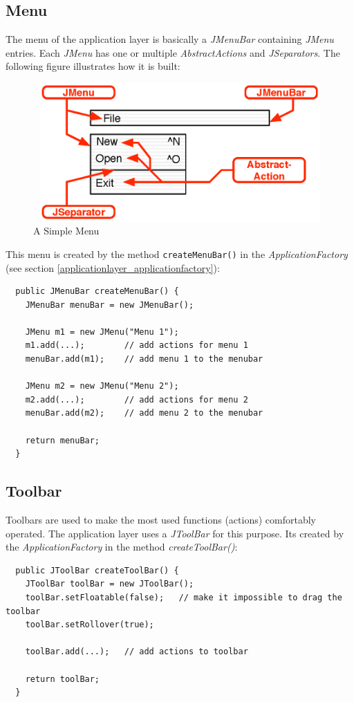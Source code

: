 \subsection{Menu}
The menu of the application layer is basically a \textit{JMenuBar} containing \textit{JMenu} entries. Each \textit{JMenu} has one or multiple \textit{AbstractActions} and \textit{JSeparators}. The following figure illustrates how it is built:
\begin{figure}[H]
\begin{center}
  \includegraphics[height= 2.08in, width= 4.85in]{../images/finalreport/application_menu.eps}
\caption{A Simple Menu}
\label{application_menu}
\end{center}
\end{figure}
This menu is created by the method \texttt{createMenuBar()} in the \textit{ApplicationFactory} (see section \ref{applicationlayer_applicationfactory}):
\begin{verbatim}
  public JMenuBar createMenuBar() {
    JMenuBar menuBar = new JMenuBar();

    JMenu m1 = new JMenu("Menu 1");
    m1.add(...);        // add actions for menu 1
    menuBar.add(m1);    // add menu 1 to the menubar
    
    JMenu m2 = new JMenu("Menu 2");
    m2.add(...);        // add actions for menu 2
    menuBar.add(m2);    // add menu 2 to the menubar
    
    return menuBar;
  }
\end{verbatim}

\subsection{Toolbar}
Toolbars are used to make the most used functions (actions) comfortably operated. The application layer uses a \textit{JToolBar} for this purpose. Its created by the \textit{ApplicationFactory} in the method \textit{createToolBar()}:
\begin{verbatim}
  public JToolBar createToolBar() {
    JToolBar toolBar = new JToolBar();
    toolBar.setFloatable(false);   // make it impossible to drag the toolbar
    toolBar.setRollover(true);

    toolBar.add(...);   // add actions to toolbar

    return toolBar;
  }
\end{verbatim}


